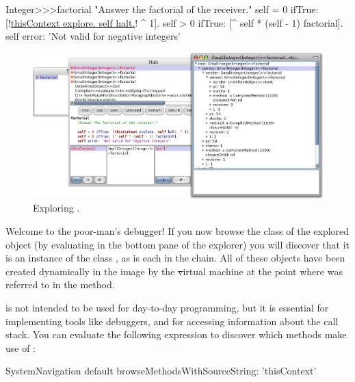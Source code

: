 \documentclass[a4paper,10pt,twoside]{book}
\begin{document}
\begin{code}{}
Integer>>>factorial
	"Answer the factorial of the receiver."
	self = 0 ifTrue: [!\underline{thisContext explore. self halt.}! ^ 1].
	self > 0 ifTrue: [^ self * (self - 1) factorial].
	self error: 'Not valid for negative integers'
\end{code}


\begin{figure}[ht]\centering
	\includegraphics[width=\linewidth]{exploringThisContext}
	\caption{Exploring .}
\end{figure}

Welcome to the poor-man's debugger!
If you now browse the class of the explored object (\ie by evaluating  in the bottom pane of the explorer) you will discover that it is an instance of the class , as is each  in the chain. All of these objects have been created dynamically in the image by the \st virtual machine at the point where  was referred to in the  method. 

 is not intended to be used for day-to-day programming, but it is essential for implementing tools like debuggers, and for accessing information about the call stack.
You can evaluate the following expression to discover which methods make use of :

\begin{code}{}
SystemNavigation default browseMethodsWithSourceString: 'thisContext'
\end{code}
\end{document}
